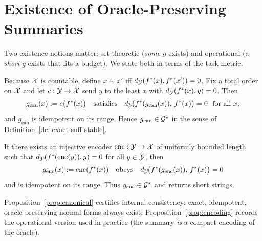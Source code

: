 \section{Existence of Oracle-Preserving Summaries}
\label{app:existence}

Two existence notions matter: set-theoretic (\emph{some} $g$ exists) and operational (a \emph{short} $g$ exists that fits a budget). We state both in terms of the task metric.

\begin{proposition}
\label{prop:canonical}
Because $\mathcal{X}$ is countable, define $x\sim x'$ iff $d_{\mathcal{Y}}(f^{\ast}(x),f^{\ast}(x'))=0$. Fix a total order on $\mathcal{X}$ and let $c:\mathcal{Y}\to\mathcal{X}$ send $y$ to the least $x$ with $d_{\mathcal{Y}}(f^{\ast}(x),y)=0$. Then
\[
g_{\mathrm{can}}(x):=c\big(\fstar(x)\big)
\quad\text{satisfies}\quad
\metric\!\big(\fstar(g_{\mathrm{can}}(x)),\,\fstar(x)\big)=0\ \ \text{for all }x,
\]
and $g_{\mathrm{can}}$ is idempotent on its range. Hence $g_{\mathrm{can}}\in\mathcal{G}^\star$ in the sense of Definition~\ref{def:exact-suff-stable}.
\end{proposition}

\begin{proposition}
\label{prop:encoding}
If there exists an injective encoder $\mathrm{enc}:\mathcal{Y}\to\mathcal{X}$ of uniformly bounded length such that
$d_{\mathcal{Y}}(f^{\ast}(\mathrm{enc}(y)),y)=0$ for all $y\in\mathcal{Y}$, then
\[
g_{\mathrm{enc}}(x):=\mathrm{enc}(f^{\ast}(x))
\quad\text{obeys}\quad
d_{\mathcal{Y}}\!\big(f^{\ast}(g_{\mathrm{enc}}(x)),\,f^{\ast}(x)\big)=0
\]
and is idempotent on its range. Thus $g_{\mathrm{enc}}\in\mathcal{G}^\star$ and returns short strings.
\end{proposition}

Proposition~\ref{prop:canonical} certifies internal consistency: exact, idempotent, oracle-preserving normal forms always exist; Proposition~\ref{prop:encoding} records the operational version used in practice (the summary \emph{is} a compact encoding of the oracle).



